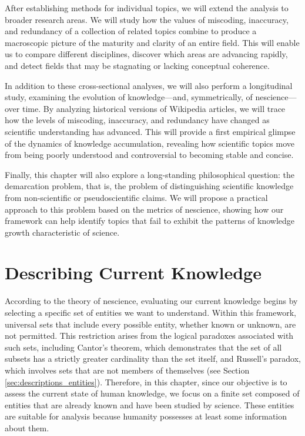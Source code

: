 After establishing methods for individual topics, we will extend the analysis to broader research areas. We will study how the values of miscoding, inaccuracy, and redundancy of a collection of related topics combine to produce a macroscopic picture of the maturity and clarity of an entire field. This will enable us to compare different disciplines, discover which areas are advancing rapidly, and detect fields that may be stagnating or lacking conceptual coherence.

In addition to these cross-sectional analyses, we will also perform a longitudinal study, examining the evolution of knowledge—and, symmetrically, of nescience—over time. By analyzing historical versions of Wikipedia articles, we will trace how the levels of miscoding, inaccuracy, and redundancy have changed as scientific understanding has advanced. This will provide a first empirical glimpse of the dynamics of knowledge accumulation, revealing how scientific topics move from being poorly understood and controversial to becoming stable and concise.

Finally, this chapter will also explore a long-standing philosophical question: the demarcation problem, that is, the problem of distinguishing scientific knowledge from non-scientific or pseudoscientific claims. We will propose a practical approach to this problem based on the metrics of nescience, showing how our framework can help identify topics that fail to exhibit the patterns of knowledge growth characteristic of science.

%
%
\section{Describing Current Knowledge}

According to the theory of nescience, evaluating our current knowledge begins by selecting a specific set of entities we want to understand. Within this framework, universal sets that include every possible entity, whether known or unknown, are not permitted. This restriction arises from the logical paradoxes associated with such sets, including Cantor's theorem, which demonstrates that the set of all subsets has a strictly greater cardinality than the set itself, and Russell's paradox, which involves sets that are not members of themselves (see Section \ref{sec:descriptions_entities}). Therefore, in this chapter, since our objective is to assess the current state of human knowledge, we focus on a finite set composed of entities that are already known and have been studied by science. These entities are suitable for analysis because humanity possesses at least some information about them.

